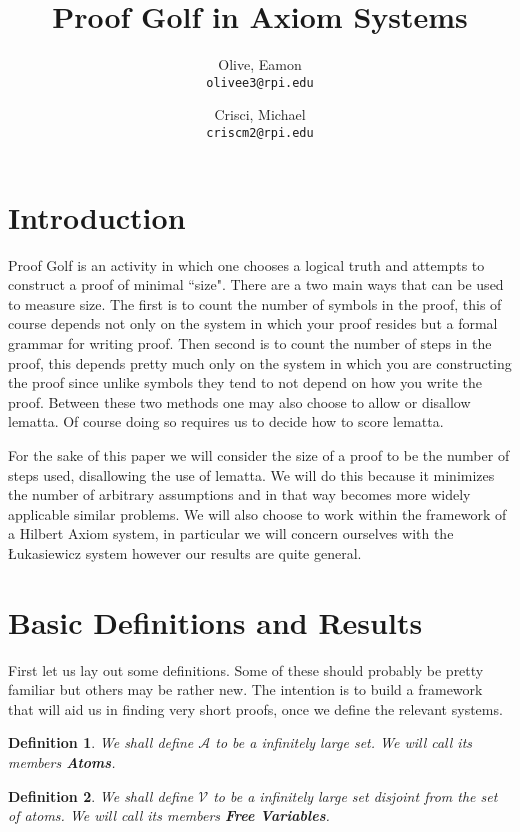 \documentclass{article}
\title{Proof Golf in Axiom Systems}
\author{
Olive, Eamon \\
\texttt{olivee3@rpi.edu}
\and
Crisci, Michael \\
\texttt{criscm2@rpi.edu}
}
\newtheorem{defin}{Definition}
\begin{document}
\maketitle

\section{Introduction}

Proof Golf is an activity in which one chooses a logical truth and attempts to construct a proof of minimal ``size".
There are a two main ways that can be used to measure size.
The first is to count the number of symbols in the proof, this of course depends not only on the system in which your proof resides but a formal grammar for writing proof.
Then second is to count the number of steps in the proof, this depends pretty much only on the system in which you are constructing the proof since unlike symbols they tend to not depend on how you write the proof.
Between these two methods one may also choose to allow or disallow lematta.
Of course doing so requires us to decide how to score lematta.

For the sake of this paper we will consider the size of a proof to be the number of steps used, disallowing the use of lematta.
We will do this because it minimizes the number of arbitrary assumptions and in that way becomes more widely applicable similar problems.
We will also choose to work within the framework of a Hilbert Axiom system, in particular we will concern ourselves with the \L ukasiewicz system however our results are quite general.


\section{Basic Definitions and Results}

First let us lay out some definitions.
Some of these should probably be pretty familiar but others may be rather new.
The intention is to build a framework that will aid us in finding very short proofs,
once we define the relevant systems.

\begin{defin}
We shall define $\mathcal{A}$ to be a infinitely large set.
We will call its members \textbf{Atoms}.
\end{defin}

\begin{defin}
We shall define $\mathcal{V}$ to be a infinitely large set disjoint from the set of atoms.
We will call its members \textbf{Free Variables}.
\end{defin}
\end{document}
